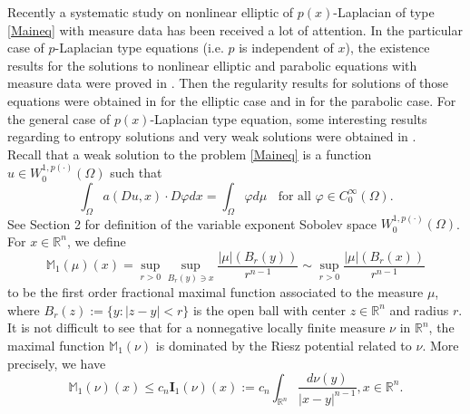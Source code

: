 \documentclass[a4paper,10pt]{amsart}
\newcommand{\Mu}{\mathbb{M}_1(\mu)}
\newcommand{\pd}{p(\cdot)}
\newcommand{\f}{\frac}
\newcommand{\Om}{\Omega}
\newcommand{\vc}{\infty}
\begin{document}
Recently a systematic study on nonlinear elliptic of $p(x)$-Laplacian of type \eqref{Maineq} with measure data has been received a lot of attention. In the particular case of $p$-Laplacian type equations (i.e. $p$ is independent of $x$), the existence results for the solutions to nonlinear elliptic and parabolic equations with measure data were proved in \cite{BG,BG2,Be.etal,BGO}. Then the regularity results for solutions of those equations were obtained in \cite{Ph} for the elliptic case and in \cite{QHN} for the parabolic case.  For the general case of  $p(x)$-Laplacian type equation, some interesting results regarding to entropy solutions and very weak solutions were obtained in \cite{BWZ,AHHL,SU,ZY}.\\


Recall that a weak solution to the problem \eqref{Maineq} is a function $u\in W^{1,\pd}_0(\Om)$ such that
$$
\int_{\Om }a(Du, x)\cdot D\varphi dx = \int_\Om \varphi d\mu \ \ \ \ \text{for all $\varphi\in C_0^\vc(\Om)$}.
$$
See Section 2 for definition of the variable exponent Sobolev space $W^{1,\pd}_0(\Om)$.\\



For $x\in \mathbb{R}^n$, we define
$$
\Mu(x)=\sup_{r>0}\sup_{B_r(y)\ni x}\f{|\mu|(B_r(y))}{r^{n-1}}\sim \sup_{r>0}\f{|\mu|(B_r(x))}{r^{n-1}}
$$
to be the first order fractional maximal function associated to the measure $\mu$, 
where $B_r(z):=\{y: |z-y|<r\}$ is the open ball with center $z\in \mathbb{R}^n$ and radius $r$. 
It is not difficult to see that for a nonnegative locally finite measure $\nu$ in $\mathbb{R}^n$, 
the maximal function $\mathbb{M}_1(\nu)$ is dominated by the Riesz potential related to $\nu$. 
More precisely, we have
$$
\mathbb{M}_1(\nu)(x)\leq c_n \mathbf{I}_1(\nu)(x):=c_n\int_{\mathbb{R}^n}\f{d\nu(y)}{|x-y|^{n-1}}, x\in \mathbb{R}^n.
$$
\end{document}
